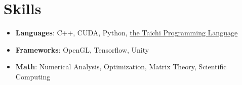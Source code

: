 \documentclass[letterpaper,11pt]{article}
\newcommand{\resumeItem}[2]{
  \item\small{
    \textbf{#1}{: #2 \vspace{-2pt}}
  }
}
\newcommand{\resumeSubItem}[2]{\resumeItem{#1}{#2}\vspace{-4pt}}
\newcommand{\resumeSubHeadingListStart}{\begin{itemize}[leftmargin=*]}
\newcommand{\resumeSubHeadingListEnd}{\end{itemize}}
\begin{document}
\section{Skills}
  \resumeSubHeadingListStart
      \resumeSubItem{Languages}{ C++, CUDA, Python, \href{https://taichi.graphics}{the Taichi Programming Language} }
	  \resumeSubItem{Frameworks}{ OpenGL, Tensorflow, Unity}
      \resumeSubItem{Math}{ Numerical Analysis, Optimization, Matrix Theory, Scientific Computing }
  \resumeSubHeadingListEnd

\end{document}
